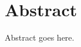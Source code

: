 \documentclass[../main.tex]{subfiles}
\begin{document}
\section*{Abstract}

Abstract goes here.
\end{document}

